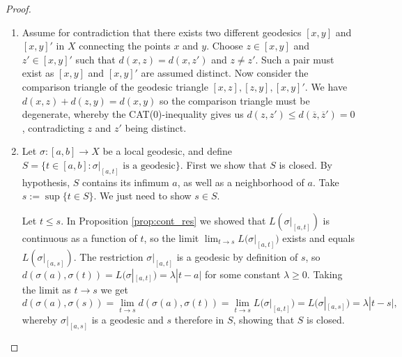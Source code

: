 \documentclass[11pt, a4paper, oneside]{memoir}
\theoremstyle{plain}\newtheorem{theorem}[subsection]{Theorem}
\theoremstyle{definition}
\newcommand{\parenum}{\setenumerate[1]{label=\textbf{(\arabic*)}}}
\newcommand{\length}[2][\sigma]{\left.L(#1\right|_{#2})}
\begin{document}
\begin{proof}
\parenum
\begin{enumerate}
    \item Assume for contradiction that there exists two different geodesics \([x,y]\) and \([x,y]'\) in \(X\) connecting the points \(x\) and \(y\).
Choose \(z\in[x,y]\) and \(z'\in[x,y]'\) such that \(d(x,z)=d(x,z')\) and \(z\neq z'\).
Such a pair must exist as \([x,y]\) and \([x,y]'\) are assumed distinct.
Now consider the comparison triangle of the geodesic triangle \([x,z],[z,y],[x,y]'\).
We have \(d(x,z)+d(z,y)=d(x,y)\) so the comparison triangle must be degenerate, whereby the CAT($0$)-inequality gives us \(d(z,z')\leq d(\overline{z},\overline{z}')=0\), contradicting \(z\) and \(z'\) being distinct.
    \item Let \(\sigma:[a,b]\to X\) be a local geodesic, and define \(S=\{t\in [a,b]:\sigma|_{[a,t]}\text{ is a geodesic}\}\).
First we show that \(S\) is closed.
By hypothesis, \(S\) contains its infimum \(a\), as well as a neighborhood of \(a\).
Take \(s:=\sup\{t\in S\}\).
We just need to show \(s\in S\).

Let \(t\leq s\). 
In Proposition \ref{prop:cont_res} we showed that \(L(\sigma|_{[a,t]})\) is continuous as a function of \(t\), so the limit \(\lim_{t\to s}\length{[a,t]}\) exists and equals \(L(\sigma|_{[a,s]})\).
The restriction \(\sigma|_{[a,t]}\) is a geodesic by definition of \(s\), so \(d(\sigma(a),\sigma(t))=L(\sigma|_{[a,t]})=\lambda|t-a|\) for some constant \(\lambda\geq 0\).
Taking the limit as \(t\to s\) we get
\[d(\sigma(a),\sigma(s))=\lim_{t\to s}d(\sigma(a),\sigma(t))=\lim_{t\to s}\length{[a,t]}=L(\sigma|_{[a,s]})=\lambda|t-s|,\]
whereby \(\sigma|_{[a,s]}\) is a geodesic and \(s\) therefore in \(S\), showing that \(S\) is closed.
 

\end{enumerate}
\end{proof}
\end{document}
